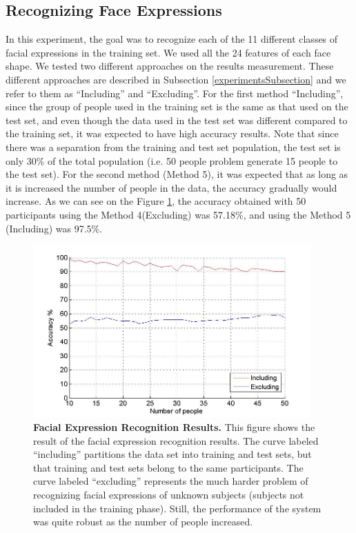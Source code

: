 \documentclass[]{article}
\begin{document}
\subsection{Recognizing Face Expressions}
In this experiment, the goal was to recognize each of the 11 different classes of facial expressions in the training
set. We used all the 24 features of each face shape. We tested two different approaches on the results measurement.
These different approaches are described in Subsection \ref{experimentsSubsection} and we refer to them as ``Including''
and ``Excluding''. For the first method ``Including'', since the group of people used in the training set is the same as
that used on the test set, and even though the data used in the test set was different compared to the training set, it
was expected to have high accuracy results. Note that since there was a separation from the training and test set
population, the test set is only 30\% of the total population (i.e. 50 people problem generate 15 people to the test
set). For the second method (Method 5), it was expected that as long as it is increased the number of people in the
data, the accuracy gradually would increase. As we can see on the Figure \ref{feRecognition}, the accuracy
obtained with 50 participants using the Method 4(Excluding) was 57.18\%, and using the Method 5 (Including) was 97.5\%.
 

\begin{figure}[ht]
\begin{center}
\vspace{-3mm}
\includegraphics[width=0.95\textwidth]{figures/figureRecognizeFacialExpressionTrue.jpg}
\end{center}
\caption{\textbf{Facial Expression Recognition Results.} This figure shows the result of the facial expression recognition results.
The curve labeled ``including'' partitions the data set into training and test sets, but that training and test sets
belong to the same participants. The curve labeled ``excluding'' represents the much harder problem of recognizing facial expressions 
of unknown subjects (subjects not included in the training phase). Still, the performance of the system was quite robust
as the number of people increased.}
\label{feRecognition}
\end{figure}
\end{document}
